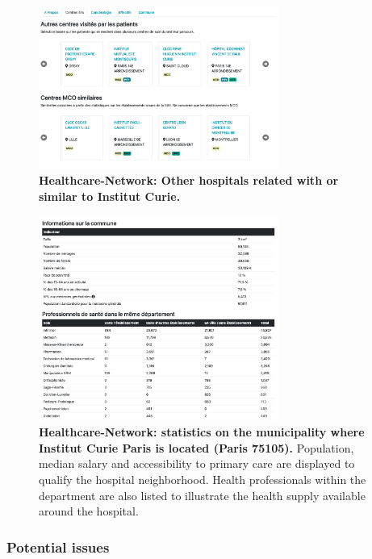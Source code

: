 \begin{figure}[H]
    \includegraphics[width=0.7\textwidth]{images/healthcare-network/curie-similar-centers.png}
    \centering
    \caption{
        \textbf{Healthcare-Network: Other hospitals related with or similar to Institut Curie.}
    }
    \label{fig:hn-curie-similar}
\end{figure}


\begin{figure}[H]
    \includegraphics[width=0.7\textwidth]{images/healthcare-network/curie-commune.png}
    \centering
    \caption{
        \textbf{Healthcare-Network: statistics on the municipality where Institut Curie Paris is located (Paris 75105).} Population, median salary and accessibility to primary care are displayed to qualify the hospital neighborhood. Health professionals within the department are also listed to illustrate the health supply available around the hospital.
    }
    \label{fig:hn-curie-commune}
\end{figure}

\subsubsection{Potential issues}

